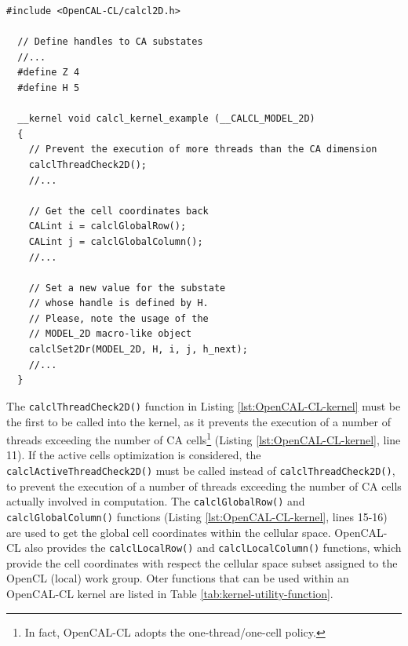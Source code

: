 \begin{lstlisting}[float,floatplacement=H, label=lst:OpenCAL-CL-kernel, caption=Example of OpenCAL-CL kernel.]
  #include <OpenCAL-CL/calcl2D.h>

  // Define handles to CA substates
  //...
  #define Z 4
  #define H 5

  __kernel void calcl_kernel_example (__CALCL_MODEL_2D)
  {
    // Prevent the execution of more threads than the CA dimension
    calclThreadCheck2D();
    //...

    // Get the cell coordinates back
    CALint i = calclGlobalRow();
    CALint j = calclGlobalColumn();
    //...

    // Set a new value for the substate
    // whose handle is defined by H.
    // Please, note the usage of the
    // MODEL_2D macro-like object
    calclSet2Dr(MODEL_2D, H, i, j, h_next);
    //...
  }
\end{lstlisting}

The \verb'calclThreadCheck2D()' function in Listing
\ref{lst:OpenCAL-CL-kernel} must be the first to be called into the
kernel, as it prevents the execution of a number of threads exceeding
the number of CA cells\footnote{In fact, OpenCAL-CL adopts the
  one-thread/one-cell policy.} (Listing \ref{lst:OpenCAL-CL-kernel},
line 11). If the active cells optimization is considered, the
\verb'calclActiveThreadCheck2D()' must be called instead of
\verb'calclThreadCheck2D()', to prevent the execution of a number of
threads exceeding the number of CA cells actually involved in
computation. The \verb'calclGlobalRow()' and
\verb'calclGlobalColumn()' functions (Listing
\ref{lst:OpenCAL-CL-kernel}, lines 15-16) are used to get the global
cell coordinates within the cellular space. OpenCAL-CL also provides
the \verb'calclLocalRow()' and \verb'calclLocalColumn()' functions,
which provide the cell coordinates with respect the cellular space
subset assigned to the OpenCL (local) work group. Oter functions that
can be used within an OpenCAL-CL kernel are listed in Table
\ref{tab:kernel-utility-function}.


